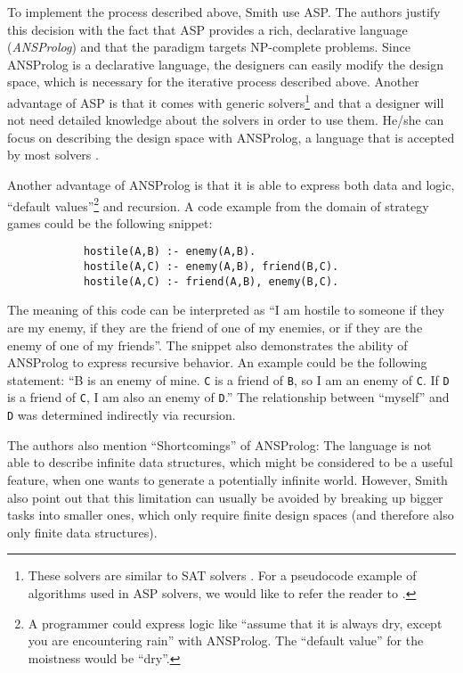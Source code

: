 \documentclass[runningheads]{llncs}
\newcommand{\authorquote}{Smith \etal}
\begin{document}
    To implement the process described above, \authorquote{} use ASP. The authors justify this decision with the fact that ASP provides a rich, declarative language (\textit{ANSProlog}) and that the paradigm targets NP-complete problems. Since ANSProlog is a declarative language, the designers can easily modify the design space, which is necessary for the iterative process described above. Another advantage of ASP is that it comes with generic solvers\footnote{These solvers are similar to SAT solvers \cite{lin2004assat}. For a pseudocode example of algorithms used in ASP solvers, we would like to refer the reader to \cite[p.~221]{russel}.} and that a designer will not need detailed knowledge about the solvers in order to use them. He/she can focus on describing the design space with ANSProlog, a language that is accepted by most solvers \cite{baral2003knowledge}.  
    
    Another advantage of ANSProlog is that it is able to express both data and logic, ``default values''\footnote{A programmer could express logic like ``assume that it is always dry, except you are encountering rain'' with ANSProlog. The ``default value'' for the moistness would be ``dry''.} and recursion. A code example from the domain of strategy games could be the following snippet: 
    \begin{verbatim}
            hostile(A,B) :- enemy(A,B).
            hostile(A,C) :- enemy(A,B), friend(B,C).
            hostile(A,C) :- friend(A,B), enemy(B,C).
    \end{verbatim}
    The meaning of this code can be interpreted as ``I am hostile to someone if they are my enemy, if they are the friend of one of my enemies, or if they are the enemy of one of my friends''. The snippet also demonstrates the ability of ANSProlog to express recursive behavior. An example could be the following statement: ``B is an enemy of mine. \verb|C| is a friend of \verb|B|, so I am an enemy of \verb|C|. If \verb|D| is a friend of \verb|C|, I am also an enemy of \verb|D|.'' The relationship between ``myself'' and \verb|D| was determined indirectly via recursion. 
    
    The authors also mention ``Shortcomings'' of ANSProlog: The language is not able to describe infinite data structures, which might be considered to be a useful feature, when one wants to generate a potentially infinite world. However, \authorquote{} also point out that this limitation can usually be avoided by breaking up bigger tasks into smaller ones, which only require  finite design spaces (and therefore also only finite data structures).
    
\end{document}
